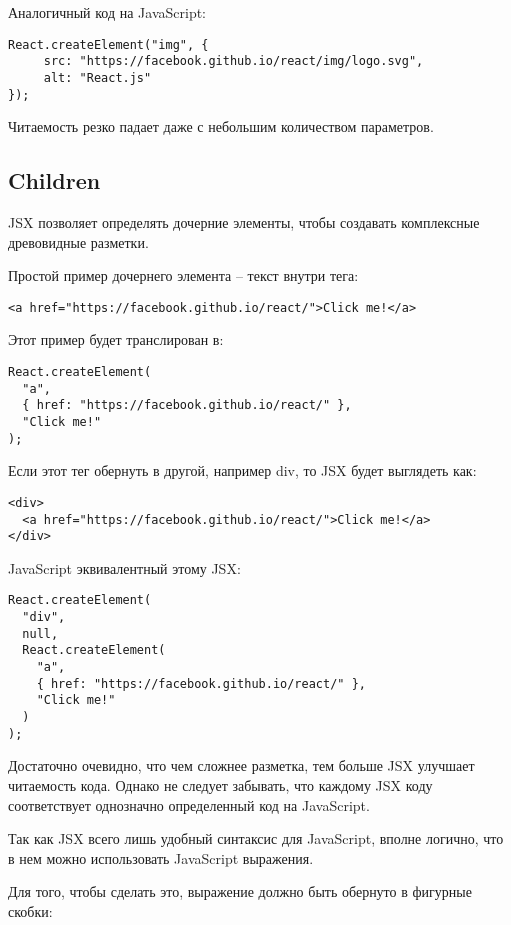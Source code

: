 Аналогичный код на JavaScript:

\begin{lstlisting}
React.createElement("img", {
     src: "https://facebook.github.io/react/img/logo.svg",
     alt: "React.js"
});
\end{lstlisting}

Читаемость резко падает даже с небольшим количеством параметров.

\subsection{Children}

JSX позволяет определять дочерние элементы, чтобы создавать комплексные древовидные разметки.

Простой пример дочернего элемента -- текст внутри тега:

\begin{lstlisting}
<a href="https://facebook.github.io/react/">Click me!</a>
\end{lstlisting}

Этот пример будет транслирован в:

\begin{lstlisting}
React.createElement(
  "a",
  { href: "https://facebook.github.io/react/" },
  "Click me!"
);
\end{lstlisting}
   
Если этот тег обернуть в другой, например div, то JSX будет выглядеть как:

\begin{lstlisting}
<div>
  <a href="https://facebook.github.io/react/">Click me!</a>
</div>
\end{lstlisting}

JavaScript эквивалентный этому JSX:

\begin{lstlisting}
React.createElement(
  "div",
  null,
  React.createElement(
    "a",
    { href: "https://facebook.github.io/react/" },
    "Click me!"
  ) 
);
\end{lstlisting}

Достаточно очевидно, что чем сложнее разметка, тем больше JSX улучшает читаемость кода. Однако не следует забывать, что каждому JSX коду соответствует однозначно определенный код на JavaScript.

Так как JSX всего лишь удобный синтаксис для JavaScript, вполне логично, что в нем можно использовать JavaScript выражения. 

Для того, чтобы сделать это, выражение должно быть обернуто в фигурные скобки:

